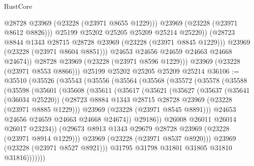 \begin{lexlean}{RustCore}
\begin{coremodule}
                      @28728
                      @23969
                      (@23228 (@23971 @8655 @1229)))
                    @23969
                    (@23228 (@23971 @8612 @8826)))
                  @25199
                  @25202
                  @25205
                  @25209
                  @25214
                  @25220))
              (@28723 @8844 @1343 @28715 @28728 @23969 (@23228 (@23971 @8845 @1229)))
              @23969
              (@23228 (@23971 @8604 @8851)))
            @24653
            @24656
            @24659
            @24663
            @24668
            @24674))
        @28728
        @23969
        (@23228 (@23971 @8596 @1229)))
      @23969
      (@23228 (@23971 @8553 @8866)))
    @25199
    @25202
    @25205
    @25209
    @25214
@36106 := @35510
    (@35526
      (@35543
        (@35556
          (@35564
            (@35568
              (@35572
                (@35578
                  (@35588
                    (@35598
                      (@35601
                        (@35608
                          (@35611
                            (@35617
                              (@35621
                                (@35627
                                  (@35637
                                    (@35641 (@36034 @25220))
                                    (@28723
                                      @8884
                                      @1343
                                      @28715
                                      @28728
                                      @23969
                                      (@23228 (@23971 @8885 @1229)))
                                    @23969
                                    (@23228 (@23971 @8545 @8891)))
                                  @24653
                                  @24656
                                  @24659
                                  @24663
                                  @24668
                                  @24674))
                              @29186))
                          @26008
                          @26011
                          @26014
                          @26017
                          @23234))
                      (@29673 @8913 @1343 @29679 @28728 @23969 (@23228 (@23971 @8914 @1229)))
                      @23969
                      (@23228 (@23971 @8537 @8920)))
                    @23969
                    (@23228 (@23971 @8527 @8921)))
                  @31795
                  @31798
                  @31801
                  @31805
                  @31810
                  @31816)))))))

\end{coremodule}
\end{lexlean}

